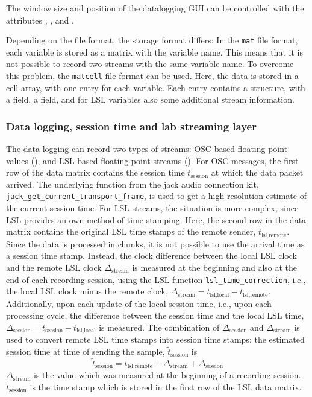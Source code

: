 The window size and position of the datalogging GUI can be controlled
with the attributes , ,  and .


Depending on the file format, the storage format differs: In the
\verb!mat! file format, each variable is stored as a matrix with the
variable name. This means that it is not possible to record two
streams with the same variable name. To overcome this problem, the
\verb!matcell! file format can be used. Here, the data is stored in a
cell array, with one entry for each variable. Each entry contains a
structure, with a  field, a  field, and for LSL
variables also some additional stream information.

\subsubsection*{Data logging, session time and lab streaming layer}

The data logging can record two types of streams: OSC based floating
point values (), and LSL based floating point streams
().
%
For OSC messages, the first row of the data matrix contains the
session time $t_\text{session}$ at which the data packet arrived.
%
The underlying function from the jack audio connection kit,
\verb!jack_get_current_transport_frame!, is used to get a high
resolution estimate of the current session time.
%
For LSL streams, the situation is more complex, since LSL provides an
own method of time stamping.
%
Here, the second row in the data matrix contains the original LSL time
stamps of the remote sender, $t_\text{lsl,remote}$.
%
Since the data is processed in chunks, it is not possible to use the
arrival time as a session time stamp.
%
Instead, the clock difference between the local LSL clock and the
remote LSL clock $\Delta_\text{stream}$ is measured at the beginning
and also at the end of each recording session, using the LSL function
\verb!lsl_time_correction!, i.e., the local LSL clock minus the remote
clock, $\Delta_\text{stream}=t_\text{lsl,local}-t_\text{lsl,remote}$.
%
Additionally, upon each update of the local session time, i.e., upon
each processing cycle, the difference between the session time and the
local LSL time,
$\Delta_\text{session}=t_\text{session}-t_\text{lsl,local}$ is
measured.
%
The combination of $\Delta_\text{session}$ and $\Delta_\text{stream}$
is used to convert remote LSL time stamps into session time stamps: the estimated session time at time of sending the sample, $\tilde{t}_\text{session}$ is
\begin{equation}
\tilde{t}_\text{session} = t_\text{lsl,remote} + \Delta_\text{stream} + \Delta_\text{session}
\end{equation}
$\Delta_\text{stream}$ is the value which was measured at the
beginning of a recording session. $\tilde{t}_\text{session}$ is the
time stamp which is stored in the first row of the LSL data matrix.

